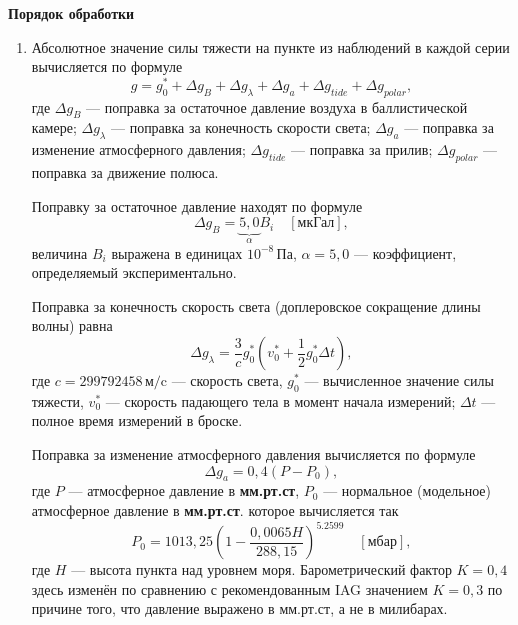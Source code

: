 \documentclass[12pt, a4paper]{article}
\theoremstyle{remark}
\begin{document}
\begin{center}
    \textbf{Порядок обработки}
\end{center}
\begin{enumerate}
    \item 
Абсолютное значение силы тяжести на пункте из наблюдений в каждой серии вычисляется по формуле
\begin{equation*}
    g = g^*_0 + \Delta g_B + \Delta g_{\lambda} + \Delta g_a  + \Delta g_{tide} + \Delta g_{polar},
\end{equation*}
где $\Delta g_B$ --- поправка за остаточное давление воздуха в баллистической камере; $\Delta
g_{\lambda}$
--- поправка за конечность скорости света; $\Delta g_a$ --- поправка за изменение атмосферного
давления; $\Delta g_{tide}$ --- поправка за прилив; $\Delta g_{polar}$ --- поправка за движение
полюса.

Поправку за остаточное давление находят по формуле
\begin{equation*}
    \Delta g_B = \underbrace{5,0}_\alpha B_i\quad[\text{мкГал}],
\end{equation*}
величина $B_i$ выражена в единицах $10^{-8}\,\text{Па}$, $\alpha = 5,0$ --- коэффициент,
определяемый экспериментально. 

Поправка за конечность скорость света (доплеровское сокращение  длины волны) равна
\begin{equation*}
    \Delta g_\lambda = \dfrac{3}{c} g_0^* \left( v_0^* + \dfrac{1}{2}g_0^* \Delta t\right),
\end{equation*}
где $c = 299 792 458\,\text{м/c}$ --- скорость света, $g_0^*$ --- вычисленное значение силы тяжести, 
$v_0^*$ --- скорость падающего тела в момент начала измерений; 
$\Delta t$ --- полное время измерений в броске.

Поправка за изменение атмосферного давления вычисляется по формуле
\begin{equation*}
    \Delta g_a = 0,4 \left( P - P_0 \right),
\end{equation*}
где $P$ --- атмосферное давление в \textbf{мм.рт.ст}, $P_0$ --- нормальное
(модельное) атмосферное давление в \textbf{мм.рт.ст}.
которое вычисляется так
\begin{equation*}
    P_0 = 1013,25 \left( 1 - \dfrac{0,0065 H}{288,15} \right)^{5.2599}\quad[\textbf{мбар}],
\end{equation*}
где $H$ --- высота пункта над уровнем моря. Барометрический фактор $K = 0,4$ здесь изменён по
сравнению с рекомендованным IAG значением $K = 0,3$ по причине того, что давление выражено в мм.рт.ст, 
а не в милибарах.


\end{enumerate}
\end{document}
